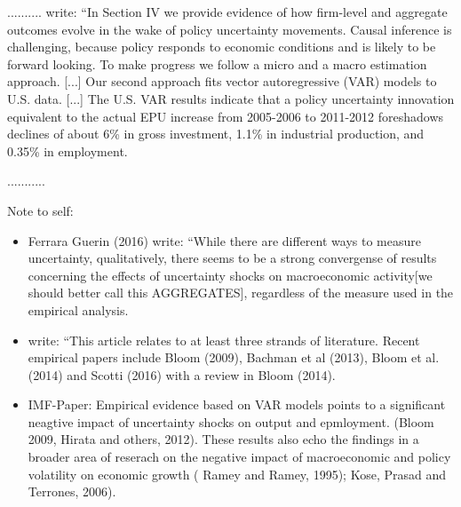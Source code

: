 \documentclass[a4paper,11pt,listof=nochaptergap,oneside,pointednumbers,bibtotoc,bigheadings,liststotoc]{scrbook}
\theoremstyle{mysatz}
\theoremstyle{mydefinition}
\theoremstyle{mybemerkung}
\begin{document}
\citet{bakeretal:15} ..........
\citet[p. 1595]{bakeretal:15} write: ``In Section IV we provide evidence of how firm-level and aggregate outcomes evolve in the wake of policy uncertainty movements. Causal inference is challenging, because policy responds to economic conditions and is likely to be forward looking. To make progress we follow a micro and a macro estimation approach. [...] Our second approach fits vector autoregressive (VAR) models to U.S. data. [...] The U.S. VAR results indicate that a policy uncertainty innovation equivalent to the actual EPU increase from 2005-2006 to 2011-2012 foreshadows declines of about 6\% in gross investment, 1.1\% in industrial production, and 0.35\% in employment. 


\citet{juradoetal:15}...........



\begingroup
    \fontsize{8pt}{12pt}\selectfont
    Note to self:
\begin{itemize}
	\item Ferrara Guerin (2016) write: ``While there are different ways to measure uncertainty, qualitatively, there seems to be a strong convergense of results concerning the effects of uncertainty shocks on macroeconomic activity[we should better call this AGGREGATES], regardless of the measure used in the empirical analysis.
	\item \citet[p. 1597]{bakeretal:15} write: ``This article relates to at least three strands of literature. Recent empirical papers include Bloom (2009), Bachman et al (2013), Bloom et al. (2014) and Scotti (2016) with a review in Bloom (2014).\\
 \item IMF-Paper: Empirical evidence based on VAR models points to a significant neagtive impact of uncertainty shocks on output and epmloyment. (Bloom 2009, Hirata and others, 2012). These results also echo the findings in a broader area of reserach on the negative impact of macroeconomic and policy volatility on economic growth ( Ramey and Ramey, 1995); Kose, Prasad and Terrones, 2006).\\
\end{itemize}
\endgroup
\end{document}
